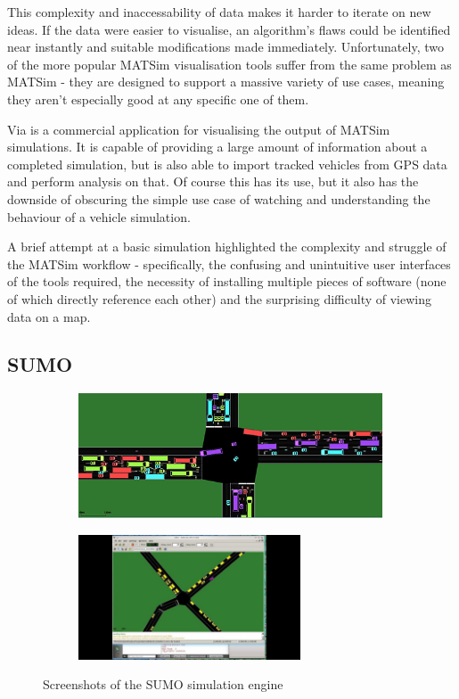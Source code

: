 \documentclass[ %
                    author={Alexander Hill},
                supervisor={Dr. Benjamin Sach},
                    degree={MEng},
                     title={MARMOSET},
                  subtitle={Multi-Agent Route Management using Online Simulation for Efficient Transportation},
                      type={research},
                      year={2016} ]{dissertation}
\begin{document}
This complexity and inaccessability of data makes it harder to iterate on new
ideas. If the data were easier to visualise, an algorithm's flaws could be
identified near instantly and suitable modifications made immediately.
Unfortunately, two of the more popular MATSim visualisation tools suffer from
the same problem as MATSim - they are designed to support a massive variety of
use cases, meaning they aren't especially good at any specific one of them.

Via is a commercial application for visualising the output of MATSim
simulations. It is capable of providing a large amount of information about a
completed simulation, but is also able to import tracked vehicles from GPS data
and perform analysis on that. Of course this has its use, but it also has the
downside of obscuring the simple use case of watching and understanding the
behaviour of a vehicle simulation.

A brief attempt at a basic simulation highlighted the complexity and struggle of
the MATSim workflow - specifically, the confusing and unintuitive user
interfaces of the tools required, the necessity of installing multiple pieces of
software (none of which directly reference each other) and the surprising
difficulty of viewing data on a map.

\subsection{SUMO}

\begin{figure}[h]
    \centering
    \begin{subfigure}[b]{0.45\textwidth}
        \centering
        \includegraphics[height=10em]{sumo-1}
    \end{subfigure}
    \hspace{1em}
    \begin{subfigure}[b]{0.45\textwidth}
        \centering
        \includegraphics[height=10em,clip,trim=7cm 0 7cm 0]{sumo-2}
    \end{subfigure}
    \caption{Screenshots of the SUMO simulation engine}\label{fig:sumo}
\end{figure}
\end{document}

